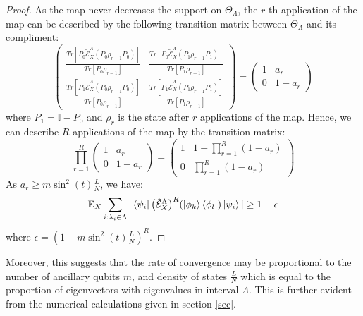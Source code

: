 \documentclass[10pt]{amsart}
\begin{document}
\begin{proof}
    As the map never decreases the support on $\Theta_{\Lambda}$, the $r$-th application of the map can be described by the following transition matrix between $\Theta_{\Lambda}$ and its compliment:
    \begin{equation}
     \begin{pmatrix}
         \frac{Tr[P_0\tilde{\mathcal{E}}^{\Lambda}_{X}(P_0\rho_{r-1}P_0)]}{Tr[P_0\rho_{r-1}] } & \frac{Tr[P_0\tilde{\mathcal{E}}^{\Lambda}_{X}(P_1\rho_{r-1}P_1)]}{Tr[P_1\rho_{r-1}] } \\ 
        \frac{Tr[P_1\tilde{\mathcal{E}}^{\Lambda}_{X}(P_0\rho_{r-1}P_0)]}{Tr[P_0\rho_{r-1}] } & \frac{Tr[P_1\tilde{\mathcal{E}}^{\Lambda}_{X}(P_1\rho_{r-1}P_1)]}{Tr[P_1\rho_{r-1}] }
    \end{pmatrix}      = \begin{pmatrix}
        1 & a_r \\ 
        0 & 1-a_r
    \end{pmatrix}        
    \end{equation}
    where $P_1 =\mathbb{I} - P_0$ and $\rho_r$ is the state after $r$ applications of the map.
    Hence, we can describe $R$ applications of the map by the transition matrix:
    \begin{equation}
          \prod_{r=1}^R \begin{pmatrix}
        1 & a_r \\ 
        0 & 1-a_r
    \end{pmatrix}  =  \begin{pmatrix}
        1 & 1-\prod_{r=1}^R (1-a_r) \\ 
        0 & \prod_{r=1}^R (1-a_r)
    \end{pmatrix}    
    \end{equation}
    As $a_r \geq m\sin^2(t)\frac{ L}{N}$, we have:
    \begin{equation}
        \mathbb{E}_X \sum_{i: \lambda_i \in \Lambda} |\bra{\psi_i} \big(\tilde{\mathcal{E}}^{\Lambda}_{X}\big)^R(\ket{\phi_k}\bra{\phi_l}) \ket{\psi_i}| \geq 1-\epsilon
    \end{equation}
    where $\epsilon = \left(1-m\sin^2(t)\frac{ L}{N}\right)^R$. 
\end{proof}

Moreover, this suggests that the rate of convergence may be proportional to the number of ancillary qubits $m$, and density of states $\frac{L}{N}$ which is equal to the proportion of eigenvectors with eigenvalues in interval $\Lambda$. This is further evident from the numerical calculations given in section \ref{sec}.
\end{document}
